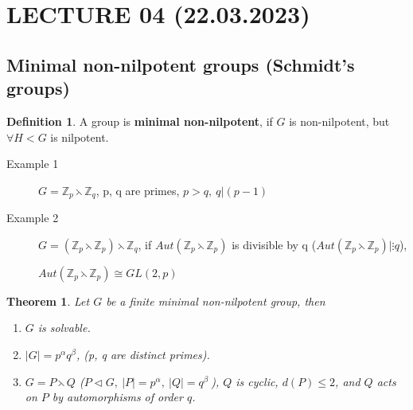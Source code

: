 \documentclass[12pt, a4paper]{article}
\newtheorem{theorem}{Theorem}[section]
\theoremstyle{definition}
\newtheorem{definition}{Definition}[section]
\begin{document}
\section{LECTURE 04 (22.03.2023)}
\subsection{Minimal non-nilpotent groups (Schmidt's groups)}
\begin{definition}
    A group is \textbf{minimal non-nilpotent}, if $G$ is non-nilpotent, but $\forall H<G$ is
    nilpotent.
\end{definition}
\begin{description}
    \item[Example 1] $G = \mathbb{Z}_p \leftthreetimes \mathbb{Z}_q $, p, q are primes, 
    $p>q,\ q|(p-1) $
    \item[Example 2] $G=(\mathbb{Z}_p \leftthreetimes \mathbb{Z}_p) \leftthreetimes 
    \mathbb{Z}_q $, if $Aut(\mathbb{Z}_p \leftthreetimes \mathbb{Z}_p) $ is divisible by q
    ($Aut(\mathbb{Z}_p \leftthreetimes \mathbb{Z}_p)|\vdots q $), 
    \par $Aut(\mathbb{Z}_p \leftthreetimes \mathbb{Z}_p) \cong GL(2,p)$
\end{description}
\begin{theorem}
    Let $G$ be a finite minimal non-nilpotent group, then 
    \begin{enumerate}
        \item $G$ is solvable.
        \item $|G| = p^\alpha q^\beta$, (p, q are distinct primes).
        \item $G=P\leftthreetimes Q $ ($P\lhd G,\ |P| = p^\alpha,\ |Q|=q^\beta\ $), $Q$ is 
        cyclic, $d (P)\leqslant 2 $, and $Q$ acts on $P$ by automorphisms of order $q$.
        \end{enumerate}
\end{theorem}
\end{document}
